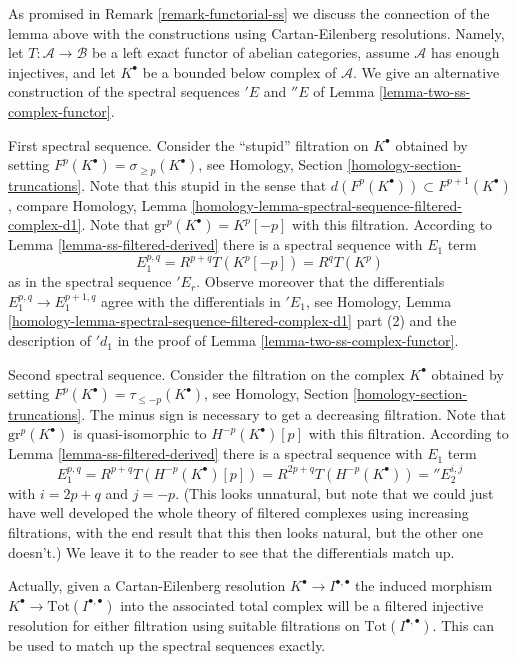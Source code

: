 \begin{remark}
\label{remark-final-functorial}
As promised in Remark \ref{remark-functorial-ss} we discuss the connection
of the lemma above with the constructions using Cartan-Eilenberg resolutions.
Namely, let $T : \mathcal{A} \to \mathcal{B}$ be a left exact functor
of abelian categories, assume $\mathcal{A}$
has enough injectives, and let $K^\bullet$ be a bounded below complex
of $\mathcal{A}$. We give an alternative construction of the
spectral sequences ${}'E$ and ${}''E$ of
Lemma \ref{lemma-two-ss-complex-functor}.

\medskip\noindent
First spectral sequence. Consider the ``stupid'' filtration on $K^\bullet$
obtained by setting $F^p(K^\bullet) = \sigma_{\geq p}(K^\bullet)$, see
Homology, Section \ref{homology-section-truncations}.
Note that this stupid in the sense that
$d(F^p(K^\bullet)) \subset F^{p + 1}(K^\bullet)$, compare
Homology, Lemma \ref{homology-lemma-spectral-sequence-filtered-complex-d1}.
Note that $\text{gr}^p(K^\bullet) = K^p[-p]$ with this filtration.
According to Lemma \ref{lemma-ss-filtered-derived} there is a spectral sequence
with $E_1$ term
$$
E_1^{p, q} = R^{p + q}T(K^p[-p]) = R^qT(K^p)
$$
as in the spectral sequence ${}'E_r$. Observe moreover that the differentials
$E_1^{p, q} \to E_1^{p + 1, q}$ agree with the differentials in $'{}E_1$, see
Homology, Lemma
\ref{homology-lemma-spectral-sequence-filtered-complex-d1} part (2)
and the description of ${}'d_1$ in the proof of
Lemma \ref{lemma-two-ss-complex-functor}.

\medskip\noindent
Second spectral sequence. Consider the filtration on the complex $K^\bullet$
obtained by setting $F^p(K^\bullet) = \tau_{\leq -p}(K^\bullet)$, see
Homology, Section \ref{homology-section-truncations}.
The minus sign is necessary
to get a decreasing filtration. Note that
$\text{gr}^p(K^\bullet)$ is quasi-isomorphic to $H^{-p}(K^\bullet)[p]$
with this filtration. According to Lemma \ref{lemma-ss-filtered-derived}
there is a spectral sequence with $E_1$ term
$$
E_1^{p, q} = R^{p + q}T(H^{-p}(K^\bullet)[p])
= R^{2p + q}T(H^{-p}(K^\bullet)) = {}''E_2^{i, j}
$$
with $i = 2p + q$ and $j = -p$. (This looks unnatural, but note that we
could just have well developed the whole theory of filtered complexes
using increasing filtrations, with the end result that this then looks
natural, but the other one doesn't.) We leave it to the reader to see
that the differentials match up.

\medskip\noindent
Actually, given a Cartan-Eilenberg resolution
$K^\bullet \to I^{\bullet, \bullet}$ the induced morphism
$K^\bullet \to \text{Tot}(I^{\bullet, \bullet})$
into the associated total complex
will be a filtered injective resolution for either filtration
using suitable filtrations on $\text{Tot}(I^{\bullet, \bullet})$.
This can be used
to match up the spectral sequences exactly.
\end{remark}






